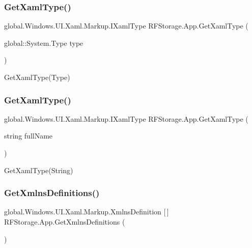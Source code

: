 \subsubsection{\texorpdfstring{GetXamlType()}{GetXamlType()}\hspace{0.1cm}{\footnotesize\ttfamily [1/2]}}
{\footnotesize\ttfamily global.\+Windows.\+U\+I.\+Xaml.\+Markup.\+I\+Xaml\+Type R\+F\+Storage.\+App.\+Get\+Xaml\+Type (\begin{DoxyParamCaption}\item[{global\+::\+System.\+Type}]{type }\end{DoxyParamCaption})}



Get\+Xaml\+Type(\+Type) 

\mbox{\label{class_r_f_storage_1_1_app_a2c3de99968533c4831c30ccd73100810}} 
\subsubsection{\texorpdfstring{GetXamlType()}{GetXamlType()}\hspace{0.1cm}{\footnotesize\ttfamily [2/2]}}
{\footnotesize\ttfamily global.\+Windows.\+U\+I.\+Xaml.\+Markup.\+I\+Xaml\+Type R\+F\+Storage.\+App.\+Get\+Xaml\+Type (\begin{DoxyParamCaption}\item[{string}]{full\+Name }\end{DoxyParamCaption})}



Get\+Xaml\+Type(\+String) 

\mbox{\label{class_r_f_storage_1_1_app_adcb9eaad4dc10dc6bac7bc34b8b33797}} 
\subsubsection{\texorpdfstring{GetXmlnsDefinitions()}{GetXmlnsDefinitions()}}
{\footnotesize\ttfamily global.\+Windows.\+U\+I.\+Xaml.\+Markup.\+Xmlns\+Definition \mbox{[}$\,$\mbox{]} R\+F\+Storage.\+App.\+Get\+Xmlns\+Definitions (\begin{DoxyParamCaption}{ }\end{DoxyParamCaption})}



